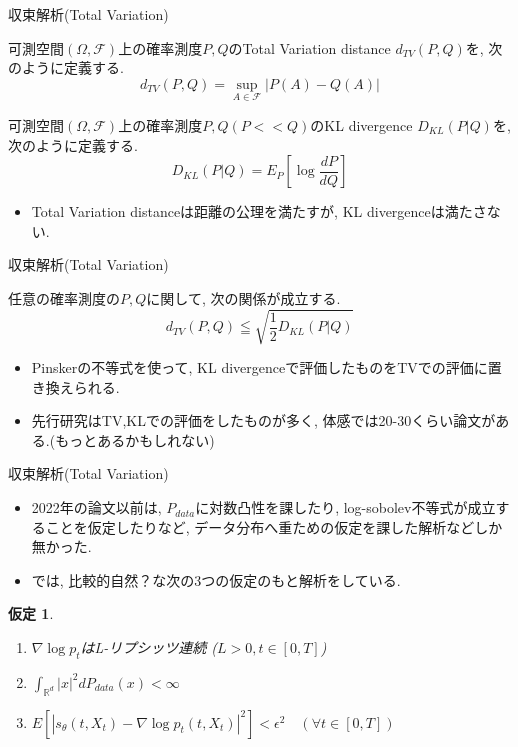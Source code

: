 \documentclass[dvipdfmx,11pt]{beamer}
\theoremstyle{plain}
\newtheorem{assumption}{仮定}
\theoremstyle{定義}
\begin{document}
  \begin{frame}{収束解析(Total Variation)}
    \begin{definition}
      可測空間$(\Omega,\mathcal{F})$上の確率測度$P,Q$のTotal Variation distance $d_{TV}(P,Q)$を, 次のように定義する.
      \begin{equation*}
        d_{TV}(P,Q)=\sup_{A\in \mathcal{F}}{|P(A)-Q(A)|}
      \end{equation*}
    \end{definition}
    \begin{definition}
      可測空間$(\Omega,\mathcal{F})$上の確率測度$P,Q(P<<Q)$のKL divergence $D_{KL}(P|Q)$を, 次のように定義する.
      \begin{equation*}
        D_{KL}(P|Q)=E_P[\log{\frac{dP}{dQ}}]
      \end{equation*}
    \end{definition}
    \begin{itemize}
      \item Total Variation distanceは距離の公理を満たすが, KL divergenceは満たさない.
    \end{itemize}
  \end{frame}
  \begin{frame}{収束解析(Total Variation)}
    \begin{theorem}[Pinskerの不等式]
      任意の確率測度の$P,Q$に関して, 次の関係が成立する.
      \begin{equation*}
        d_{TV}(P,Q)\leqq \sqrt{\frac{1}{2}D_{KL}(P|Q)}
      \end{equation*}
    \end{theorem}
    \begin{itemize}
      \item Pinskerの不等式を使って, KL divergenceで評価したものをTVでの評価に置き換えられる.
      \item 先行研究はTV,KLでの評価をしたものが多く, 体感では20-30くらい論文がある.(もっとあるかもしれない)
    \end{itemize}
  \end{frame}
  \begin{frame}{収束解析(Total Variation)}
    \begin{itemize}
      \item 2022年の論文\cite{chen_et_al_2023}以前は, $P_{data}$に対数凸性を課したり, log-sobolev不等式が成立することを仮定したりなど, データ分布へ重ための仮定を課した解析などしか無かった.
      \item \cite{chen_et_al_2023}では, 比較的自然？な次の3つの仮定のもと解析をしている.
    \end{itemize}
    \begin{assumption}
      \begin{enumerate}
        \item $\nabla \log{p_t}$はL-リプシッツ連続  ($L>0, t\in [0,T]$)
        \item $\int_{\mathbb{R}^d}|x|^2dP_{data}(x)<\infty$
        \item $E[|s_\theta(t,X_t)-\nabla\log{p_t(t,X_t)}|^2]<\epsilon^2 \quad (\forall t\in [0,T])$
      \end{enumerate}
    \end{assumption}
  \end{frame}
\end{document}
